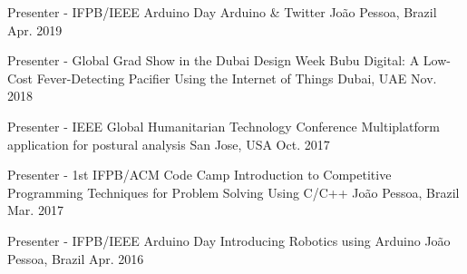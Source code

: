 

\begin{cventries}

  \cventry
    {Presenter - IFPB/IEEE Arduino Day} %
    {Arduino \& Twitter} %
    {João Pessoa, Brazil} %
    {Apr. 2019} %
    {
    }

  \cventry
    {Presenter - Global Grad Show in the Dubai Design Week} %
    {Bubu Digital: A Low-Cost Fever-Detecting Pacifier Using the Internet of Things} %
    {Dubai, UAE} %
    {Nov. 2018} %
    {
    }

  \cventry
    {Presenter - IEEE Global Humanitarian Technology Conference} %
    {Multiplatform application for postural analysis} %
    {San Jose, USA} %
    {Oct. 2017} %
    {
    }

  \cventry
    {Presenter - 1st IFPB/ACM Code Camp} %
    {Introduction to Competitive Programming Techniques for Problem Solving Using C/C++} %
    {João Pessoa, Brazil} %
    {Mar. 2017} %
    {
    }
    
  \cventry
    {Presenter - IFPB/IEEE Arduino Day} %
    {Introducing Robotics using Arduino} %
    {João Pessoa, Brazil} %
    {Apr. 2016} %
    {
    }

\end{cventries}

